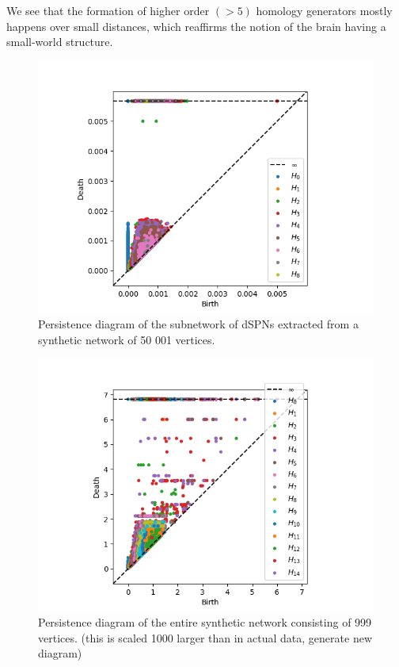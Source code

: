 We see that the formation of higher order $(> 5)$ homology generators mostly happens over small distances, which reaffirms the notion of the brain having a small-world structure.
\begin{figure}[ht]
  \centering
  \includegraphics[scale=0.8]{./counts/5kdpsnap10k.png}
  \caption{\label{pers50k} Persistence diagram of the subnetwork of dSPNs extracted from a synthetic network of 50 001 vertices. }
\end{figure}

\begin{figure}[ht]
  \centering
  \includegraphics[scale=0.8]{./counts/1kap10000.png}
  \caption{\label{pers1k} Persistence diagram of the entire synthetic network consisting of 999 vertices. (this is scaled 1000 larger than in actual data, generate new diagram)}
\end{figure}
